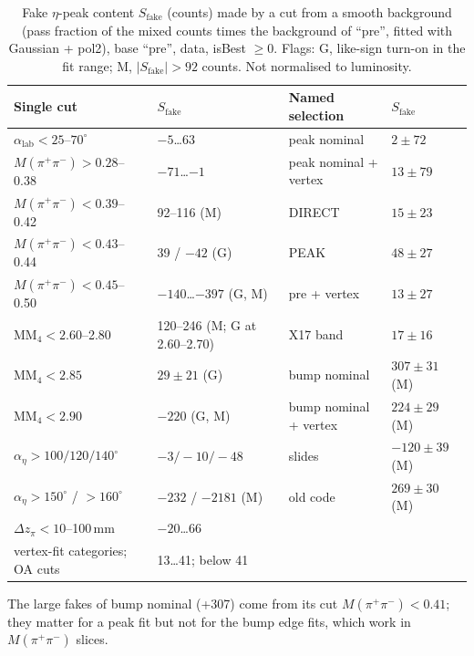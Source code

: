 \documentclass[11pt,a4paper]{article}
\newcommand{\Mpipi}{\ensuremath{M(\pi^{+}\pi^{-})}\xspace}
\newcommand{\MMfour}{\ensuremath{\mathrm{MM}_4}\xspace}
\newcommand{\dzpi}{\ensuremath{\Delta z_\pi}\xspace}
\newcommand{\alab}{\ensuremath{\alpha_{\mathrm{lab}}}\xspace}
\newcommand{\aeta}{\ensuremath{\alpha_\eta}\xspace}
\begin{document}
\begin{table}[H]
\centering
\caption{Fake $\eta$-peak content $S_{\mathrm{fake}}$ (counts) made by a cut from a smooth background (pass fraction of the mixed counts
times the background of ``pre'', fitted with Gaussian + pol2), base ``pre'', data, isBest $\ge0$. Flags: G, like-sign
turn-on in the fit range; M, $|S_{\mathrm{fake}}|>92$ counts. Not normalised to luminosity.}
\label{tab:sculpt}
\small
\begin{tabular}{@{}l l l l@{}}
\toprule
Single cut & $S_{\mathrm{fake}}$ & Named selection & $S_{\mathrm{fake}}$ \\
\midrule
$\alab<25$--$70^\circ$ & $-5$\dots$63$ & peak nominal & $2\pm72$ \\
$\Mpipi>0.28$--0.38 & $-71$\dots$-1$ & peak nominal + vertex & $13\pm79$ \\
$\Mpipi<0.39$--0.42 & 92--116 (M) & DIRECT & $15\pm23$ \\
$\Mpipi<0.43$--0.44 & 39 / $-42$ (G) & PEAK & $48\pm27$ \\
$\Mpipi<0.45$--0.50 & $-140$\dots$-397$ (G, M) & pre + vertex & $13\pm27$ \\
$\MMfour<2.60$--2.80 & 120--246 (M; G at 2.60--2.70) & X17 band & $17\pm16$ \\
$\MMfour<2.85$ & $29\pm21$ (G) & bump nominal & $307\pm31$ (M) \\
$\MMfour<2.90$ & $-220$ (G, M) & bump nominal + vertex & $224\pm29$ (M) \\
$\aeta>100/120/140^\circ$ & $-3/-10/-48$ & slides & $-120\pm39$ (M) \\
$\aeta>150^\circ$ / $>160^\circ$ & $-232$ / $-2181$ (M) & old code & $269\pm30$ (M) \\
$\dzpi<10$--100\,mm & $-20$\dots$66$ & & \\
vertex-fit categories; OA cuts & 13\dots41; below 41 & & \\
\bottomrule
\end{tabular}
\end{table}
The large fakes of bump nominal (+307) come from its cut $\Mpipi<0.41$; they matter for a peak fit but not for the
bump edge fits, which work in \Mpipi slices.
\end{document}
